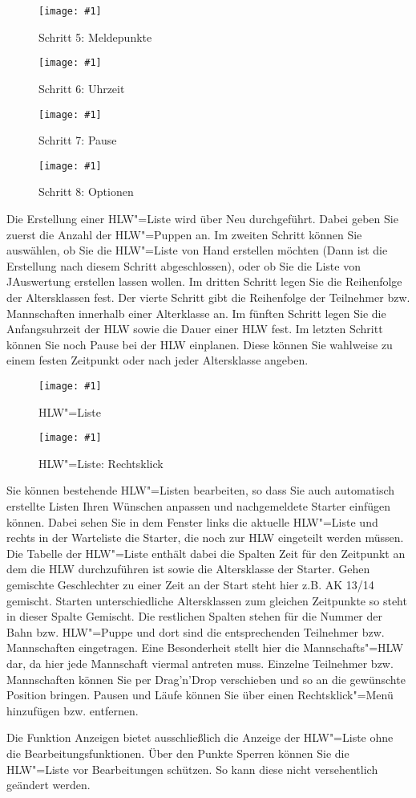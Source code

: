 \documentclass[11pt,a4paper,twoside,ngerman]{article}
\newcommand{\hsmimage}[3]{\begin{figure}[!ht]\centering\texttt{[image: \#1]}\caption{#3}\end{figure}}
\begin{document}
\hsmimage{pics/hlw-liste-neu-5}{.60\textwidth}{Schritt 5: Meldepunkte}

\hsmimage{pics/hlw-liste-neu-6}{.51\textwidth}{Schritt 6: Uhrzeit}

\hsmimage{pics/hlw-liste-neu-7}{.51\textwidth}{Schritt 7: Pause}

\hsmimage{pics/hlw-liste-neu-8}{.60\textwidth}{Schritt 8: Optionen}
Die Erstellung einer HLW"=Liste wird über \glqq{}Neu\grqq{} durchgeführt. Dabei geben Sie zuerst die Anzahl der HLW"=Puppen an. Im zweiten Schritt können Sie auswählen, ob Sie die HLW"=Liste von Hand erstellen möchten (Dann ist die Erstellung nach diesem Schritt abgeschlossen), oder ob Sie die Liste von JAuswertung erstellen lassen wollen. Im dritten Schritt legen Sie die Reihenfolge der Altersklassen fest. Der vierte Schritt gibt die Reihenfolge der Teilnehmer bzw. Mannschaften innerhalb einer Alterklasse an. Im fünften Schritt legen Sie die Anfangsuhrzeit der HLW sowie die Dauer einer HLW fest. Im letzten Schritt können Sie noch Pause bei der HLW einplanen. Diese können Sie wahlweise zu einem festen Zeitpunkt oder nach jeder Altersklasse angeben.


\hsmimage{pics/hlw-liste-bearbeiten}{.80\textwidth}{HLW"=Liste}

\hsmimage{pics/hlw-liste-bearbeiten-popup}{.24\textwidth}{HLW"=Liste: Rechtsklick}
Sie können bestehende HLW"=Listen bearbeiten, so dass Sie auch automatisch erstellte Listen Ihren Wünschen anpassen und nachgemeldete Starter einfügen können. Dabei sehen Sie in dem Fenster links die aktuelle HLW"=Liste und rechts in der \glqq{}Warteliste\grqq{} die Starter, die noch zur HLW eingeteilt werden müssen. Die Tabelle der HLW"=Liste enthält dabei die Spalten \glqq{}Zeit\grqq{} für den Zeitpunkt an dem die HLW durchzuführen ist sowie die Altersklasse der Starter. Gehen gemischte Geschlechter zu einer Zeit an der Start steht hier z.B. \glqq{}AK 13/14 gemischt\grqq{}. Starten unterschiedliche Altersklassen zum gleichen Zeitpunkte so steht in dieser Spalte \glqq{}Gemischt\grqq{}. Die restlichen Spalten stehen für die Nummer der Bahn bzw. HLW"=Puppe und dort sind die entsprechenden Teilnehmer bzw. Mannschaften eingetragen. Eine Besonderheit stellt hier die Mannschafts"=HLW dar, da hier jede Mannschaft viermal antreten muss. Einzelne Teilnehmer bzw. Mannschaften können Sie per Drag'n'Drop verschieben und so an die gewünschte Position bringen. Pausen und Läufe können Sie über einen Rechtsklick"=Menü hinzufügen bzw. entfernen.

Die Funktion \glqq{}Anzeigen\grqq{} bietet ausschließlich die Anzeige der HLW"=Liste ohne die Bearbeitungsfunktionen. Über den Punkte \glqq{}Sperren\grqq{} können Sie die HLW"=Liste vor Bearbeitungen schützen. So kann diese nicht versehentlich geändert werden.
\end{document}
